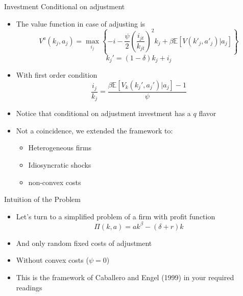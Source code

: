 \documentclass[11pt,aspectratio=169,xcolor={dvipsnames},hyperref={pdftex,pdfpagemode=UseNone,hidelinks,pdfdisplaydoctitle=true},usepdftitle=false]{beamer}
\begin{document}
\begin{frame}{Investment Conditional on adjustment}
\begin{itemize}
\item The value function in case of adjusting is
$$V^a(k_j,a_j) =\max_{i_j} \left\lbrace- i  - \frac{\psi}{2}\left(\frac{i_{jt}}{k_{jt}}\right)^2 k_{j} + \beta \mathbb{E} \left[ V(k'_j, a'_j) | a_j \right] \right\rbrace$$
\vspace{-0.5cm}
$$k_j' = (1-\delta) k_j + i_j $$
\vspace{-0.5cm}
\pause
\item With first order condition
$$\frac{i_j}{k_j} = \frac{\beta \mathbb{E}  \left[ V_k(k_j',a_j')|a_j \right] - 1}{\psi}$$
\pause
\item Notice that conditional on adjustment investment has a $q$ flavor
\pause
\item Not a coincidence, we extended the framework to:
\begin{itemize}
\item Heterogeneous firms
\item Idiosyncratic shocks
\item non-convex costs
\end{itemize}
\end{itemize}
\end{frame}

\begin{frame}{Intuition of the Problem}
\begin{itemize}
\item Let's turn to a simplified problem of a firm with profit function
$$\Pi(k,a) = ak^{\beta} - (\delta + r) k$$
\pause
\item And only random fixed costs of adjustment
\item Without convex costs  ($\psi =0$)
\pause
\item This is the framework of Caballero and Engel (1999) in your required readings
\end{itemize}
\end{frame}
\end{document}
